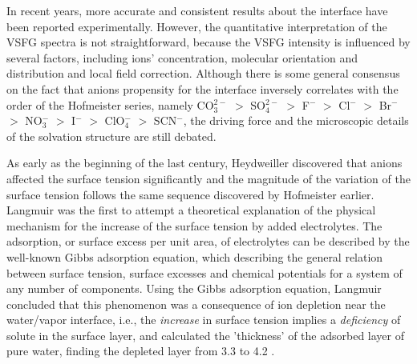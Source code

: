 
In recent years, more accurate and consistent results about the interface have been reported experimentally\cite{TianCS2009,Shen2013}. 
However, the quantitative interpretation of the VSFG spectra is not straightforward, because the VSFG intensity is influenced by several factors, including ions' concentration, 
molecular orientation and distribution and local field correction\cite{Morita2008}.
Although there is some general consensus on the fact that anions propensity for the interface inversely correlates with
the order of the Hofmeister series, namely 
CO$_3^{2-}$ $>$  SO$_4^{2-}$ $>$ F$^-$ $>$ Cl$^-$ $>$ Br$^-$ $>$ NO$_3^-$ $>$ I$^-$ $>$ ClO$_4^-$ $>$ SCN$^-$\cite{PJ06,ZYJ10,DT08,Parsons2011,HuaWei2013}, the driving force and the microscopic details of the solvation structure are still debated. 

As early as the beginning of the last century, Heydweiller discovered that anions affected the surface tension significantly
and the magnitude of the variation of the surface tension follows the same sequence discovered by Hofmeister earlier\cite{dosSantos10}.
Langmuir\cite{Langmuir1917} was the first to attempt a theoretical explanation of the physical mechanism for the increase of the surface tension by added electrolytes.
The adsorption, or surface excess per unit area, of electrolytes can be described by the well-known Gibbs adsorption equation, which describing the general relation between
surface tension, surface excesses and chemical potentials for a system of any number of components.
Using the Gibbs adsorption equation, Langmuir concluded that this phenomenon was a consequence of ion depletion 
near the water/vapor interface, i.e., the \emph{increase} in surface tension 
implies a \emph{deficiency} of solute in the surface layer\cite{Jarvis1968}, and
calculated the 'thickness' of the adsorbed layer of pure water, finding 
the depleted layer from 3.3 to 4.2 \A. 

